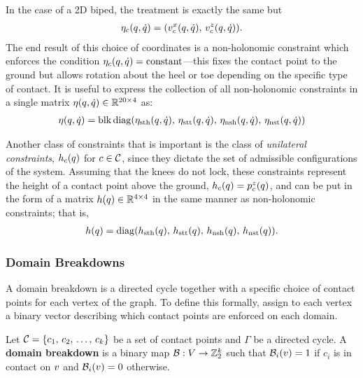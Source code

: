 %
In the case of a 2D biped, the treatment is exactly the same but
\begin{align*}
  \eta_{c}(q, \dot{q}) = (v_{c}^{x}(q, \dot{q}), \, v_{c}^{z}(q, \dot{q})).
\end{align*}
%
The end result of this choice of coordinates is a non-holonomic constraint which
enforces the condition $\eta_{c}(q, \dot{q}) = \mathrm{constant}$---this fixes the
contact point to the ground but allows rotation about the heel or toe depending
on the specific type of contact.
%
It is useful to express the collection of all non-holonomic constraints in a
single matrix $\eta(q, \dot{q}) \in \mathbb{R}^{20 \times 4}$ as:
\begin{align*}
  \eta(q, \dot{q}) = \operatorname*{blk\,diag}(\eta_{\mathrm{sth}}(q, \dot{q}), \, \eta_{\mathrm{stt}}(q, \dot{q}), \,
  \eta_{\mathrm{nsh}}(q, \dot{q}), \, \eta_{\mathrm{nst}}(q, \dot{q}))
\end{align*}

Another class of constraints that is important is the class of {\em unilateral
  constraints}, $h_{c}(q)$ for $c \in \mathcal{C}$, since they dictate the set of
admissible configurations of the system.
%
Assuming that the knees do not lock, these constraints represent the height of a
contact point above the ground, $h_{c}(q) = p_{c}^{z}(q)$, and can be put
in the form of a matrix $h(q) \in \mathbb{R}^{4 \times 4}$ in the same manner as
non-holonomic constraints;
%
that is,
\begin{align*}
  h(q) = \operatorname*{diag}(h_{\mathrm{sth}}(q), \, h_{\mathrm{stt}}(q), \,  h_{\mathrm{nsh}}(q), \,
  h_{\mathrm{nst}}(q)).
\end{align*}


\subsubsection{Domain Breakdowns}

A domain breakdown is a directed cycle together with a specific choice of
contact points for each vertex of the graph.
%
To define this formally, assign to each vertex a binary vector describing which
contact points are enforced on each domain.

\begin{definition}
  \label{def:domainbreakdown}
  Let $\mathcal{C} = \{c_{1}, \, c_{2}, \, \ldots, \, c_{k}\}$ be a set of contact points
  and $\Gamma$ be a directed cycle.
  A {\bf domain breakdown} is a binary map $\mathcal{B} : V \to \mathbb{Z}_{2}^{k}$ such that
  $\mathcal{B}_{i}(v) = 1$ if $c_{i}$ is in contact on $v$ and $\mathcal{B}_{i}(v) = 0$
  otherwise.
\end{definition}

